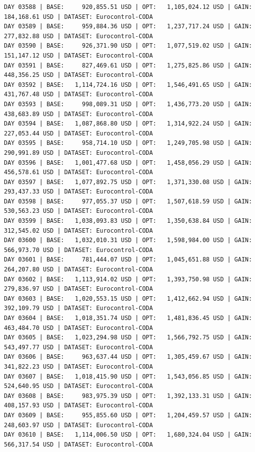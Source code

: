 \documentclass[11pt,a4paper]{article}
\begin{document}
\begin{verbatim}
DAY 03588 | BASE:     920,855.51 USD | OPT:   1,105,024.12 USD | GAIN: 184,168.61 USD | DATASET: Eurocontrol-CODA
DAY 03589 | BASE:     959,884.36 USD | OPT:   1,237,717.24 USD | GAIN: 277,832.88 USD | DATASET: Eurocontrol-CODA
DAY 03590 | BASE:     926,371.90 USD | OPT:   1,077,519.02 USD | GAIN: 151,147.12 USD | DATASET: Eurocontrol-CODA
DAY 03591 | BASE:     827,469.61 USD | OPT:   1,275,825.86 USD | GAIN: 448,356.25 USD | DATASET: Eurocontrol-CODA
DAY 03592 | BASE:   1,114,724.16 USD | OPT:   1,546,491.65 USD | GAIN: 431,767.48 USD | DATASET: Eurocontrol-CODA
DAY 03593 | BASE:     998,089.31 USD | OPT:   1,436,773.20 USD | GAIN: 438,683.89 USD | DATASET: Eurocontrol-CODA
DAY 03594 | BASE:   1,087,868.80 USD | OPT:   1,314,922.24 USD | GAIN: 227,053.44 USD | DATASET: Eurocontrol-CODA
DAY 03595 | BASE:     958,714.10 USD | OPT:   1,249,705.98 USD | GAIN: 290,991.89 USD | DATASET: Eurocontrol-CODA
DAY 03596 | BASE:   1,001,477.68 USD | OPT:   1,458,056.29 USD | GAIN: 456,578.61 USD | DATASET: Eurocontrol-CODA
DAY 03597 | BASE:   1,077,892.75 USD | OPT:   1,371,330.08 USD | GAIN: 293,437.33 USD | DATASET: Eurocontrol-CODA
DAY 03598 | BASE:     977,055.37 USD | OPT:   1,507,618.59 USD | GAIN: 530,563.23 USD | DATASET: Eurocontrol-CODA
DAY 03599 | BASE:   1,038,093.83 USD | OPT:   1,350,638.84 USD | GAIN: 312,545.02 USD | DATASET: Eurocontrol-CODA
DAY 03600 | BASE:   1,032,010.31 USD | OPT:   1,598,984.00 USD | GAIN: 566,973.70 USD | DATASET: Eurocontrol-CODA
DAY 03601 | BASE:     781,444.07 USD | OPT:   1,045,651.88 USD | GAIN: 264,207.80 USD | DATASET: Eurocontrol-CODA
DAY 03602 | BASE:   1,113,914.02 USD | OPT:   1,393,750.98 USD | GAIN: 279,836.97 USD | DATASET: Eurocontrol-CODA
DAY 03603 | BASE:   1,020,553.15 USD | OPT:   1,412,662.94 USD | GAIN: 392,109.79 USD | DATASET: Eurocontrol-CODA
DAY 03604 | BASE:   1,018,351.74 USD | OPT:   1,481,836.45 USD | GAIN: 463,484.70 USD | DATASET: Eurocontrol-CODA
DAY 03605 | BASE:   1,023,294.98 USD | OPT:   1,566,792.75 USD | GAIN: 543,497.77 USD | DATASET: Eurocontrol-CODA
DAY 03606 | BASE:     963,637.44 USD | OPT:   1,305,459.67 USD | GAIN: 341,822.23 USD | DATASET: Eurocontrol-CODA
DAY 03607 | BASE:   1,018,415.90 USD | OPT:   1,543,056.85 USD | GAIN: 524,640.95 USD | DATASET: Eurocontrol-CODA
DAY 03608 | BASE:     983,975.39 USD | OPT:   1,392,133.31 USD | GAIN: 408,157.93 USD | DATASET: Eurocontrol-CODA
DAY 03609 | BASE:     955,855.60 USD | OPT:   1,204,459.57 USD | GAIN: 248,603.97 USD | DATASET: Eurocontrol-CODA
DAY 03610 | BASE:   1,114,006.50 USD | OPT:   1,680,324.04 USD | GAIN: 566,317.54 USD | DATASET: Eurocontrol-CODA

\end{verbatim}
\end{document}

